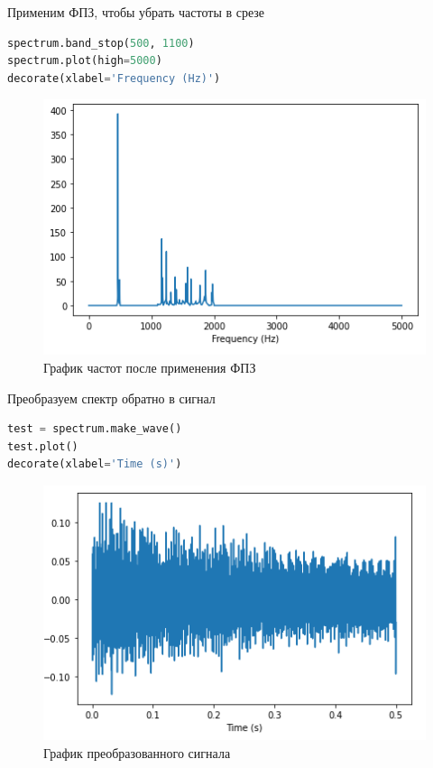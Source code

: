 Применим ФПЗ, чтобы убрать частоты в срезе
\begin{lstlisting}[language=Python]
spectrum.band_stop(500, 1100)
spectrum.plot(high=5000)
decorate(xlabel='Frequency (Hz)')
\end{lstlisting}

\begin{figure}[H]
	\begin{center}
		\includegraphics[scale=1]{fig/lab01/lab01_06.png}
		\caption{График частот после применения ФПЗ}
	\end{center}
\end{figure}

Преобразуем спектр обратно в сигнал
\begin{lstlisting}[language=Python]
test = spectrum.make_wave()
test.plot()
decorate(xlabel='Time (s)')
\end{lstlisting}

\begin{figure}[H]
	\begin{center}
		\includegraphics[scale=1]{fig/lab01/lab01_07.png}
		\caption{График преобразованного сигнала}
	\end{center}
\end{figure}


